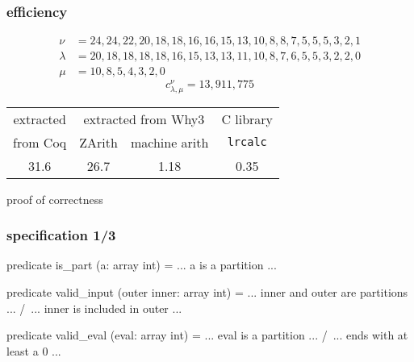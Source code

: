 \documentclass{beamer}
\let\emph\alert
\begin{document}
\begin{frame}\frametitle{efficiency}
  \begin{displaymath}
    \begin{array}{ll}
      \nu & = 24,24,22,20,18,18,16,16,15,13,10,8,8,7,5,5,5,3,2,1 \\
      \lambda & = 20,18,18,18,18,16,15,13,13,11,10,8,7,6,5,5,3,2,2,0 \\
      \mu & = 10,8,5,4,3,2,0
    \end{array}
  \end{displaymath}
  \begin{displaymath}
    c_{\lambda, \mu}^{\nu} = 13,911,775
  \end{displaymath}
  \bigskip
  \begin{center}
    \begin{tabular}{|c|c|c|c|}
      \hline
      extracted & \multicolumn{2}{|c|}{extracted from Why3} & C library \\
      \cline{2-3}
      from Coq  &   ZArith  & machine arith & \texttt{lrcalc} \\
      \hline\hline
      31.6      &    26.7   & 1.18 & 0.35 \\
      \hline
    \end{tabular}
  \end{center}
\end{frame}

\begin{frame}
  \begin{center}
    \emph{proof of correctness} \\
    \hrulefill
  \end{center}
\end{frame}

\begin{frame}[fragile]\frametitle{specification 1/3}
\begin{why3}
predicate is_part (a: array int) =
  ... a is a partition ...
\end{why3}
\begin{why3}
predicate valid_input (outer inner: array int) =
  ... inner and outer are partitions ... /\
  ... inner is included in outer ...
\end{why3}
\begin{why3}
predicate valid_eval (eval: array int) =
  ... eval is a partition ... /\
  ... ends with at least a 0 ...
\end{why3}
\end{frame}
\end{document}
